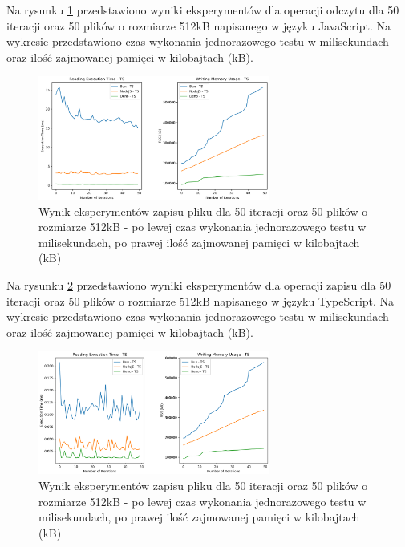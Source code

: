 Na rysunku \ref{fig:file_e1_writing_js} przedstawiono wyniki eksperymentów dla operacji odczytu dla 50 iteracji oraz 50 plików o rozmiarze 512kB napisanego w języku JavaScript. Na wykresie przedstawiono czas wykonania jednorazowego testu w milisekundach oraz ilość zajmowanej pamięci w kilobajtach (kB).

\begin{figure}[H]
  \centering
  \includegraphics[width=0.68\textwidth]{Figures/files/files_writing_50_500_50_ts.png}
  \caption{Wynik eksperymentów zapisu pliku dla 50 iteracji oraz 50 plików o rozmiarze 512kB - po lewej czas wykonania jednorazowego testu w milisekundach, po prawej ilość zajmowanej pamięci w kilobajtach (kB)}
  \label{fig:file_e1_writing_js}
\end{figure}

Na rysunku \ref{fig:file_e1_reading_ts} przedstawiono wyniki eksperymentów dla operacji zapisu dla 50 iteracji oraz 50 plików o rozmiarze 512kB napisanego w języku TypeScript. Na wykresie przedstawiono czas wykonania jednorazowego testu w milisekundach oraz ilość zajmowanej pamięci w kilobajtach (kB).

\begin{figure}[H]
  \centering
  \includegraphics[width=0.68\textwidth]{Figures/files/files_reading_50_500_50_ts.png}
  \caption{Wynik eksperymentów zapisu pliku dla 50 iteracji oraz 50 plików o rozmiarze 512kB - po lewej czas wykonania jednorazowego testu w milisekundach, po prawej ilość zajmowanej pamięci w kilobajtach (kB)}
  \label{fig:file_e1_reading_ts}
\end{figure}

